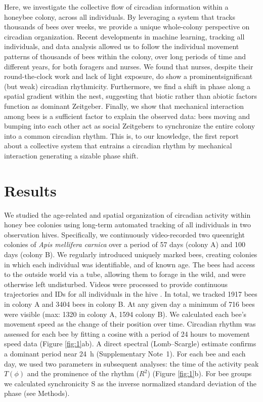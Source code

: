 \documentclass{article}
\newcommand{\added}[1]{{\color{blue}#1}}
\newcommand{\deleted}[1]{{\color{red}#1}} %
\newcommand{\replaced}[2]{\deleted{#1}\added{#2}}
\newcommand{\added}[1]{#1}
\newcommand{\deleted}[1]{}
\newcommand{\replaced}[2]{#2}
\begin{document}
Here, we investigate the collective flow of circadian information within a honeybee colony, across all individuals. \added{By leveraging a system that tracks thousands of bees over weeks, we provide a unique whole-colony perspective on circadian organization.} Recent developments in machine learning, tracking all individuals, and data analysis allowed us to follow the individual movement patterns of thousands of bees within the colony, over long periods of time and different years, for both foragers and nurses. We found that nurses, despite their round-the-clock work and lack of light exposure, do show a \replaced{prominent}{significant} (but weak) circadian rhythmicity. Furthermore, we find a shift in phase along a spatial gradient within the nest, suggesting that biotic rather than abiotic factors function as dominant Zeitgeber. Finally, we show that mechanical interaction among bees is a sufficient factor to explain the observed data: bees moving and bumping into each other act as social Zeitgebers to synchronize the entire colony into a common circadian rhythm. This is, to our knowledge, the first report about a collective system that entrains a circadian rhythm by mechanical interaction generating a sizable phase shift. 


\section{Results}
We studied the age-related and spatial organization of circadian activity within honey bee colonies using long-term automated tracking of all individuals in two observation hives. Specifically, we continuously video-recorded two queenright colonies of \textit{Apis mellifera carnica} over a period of 57 days (colony A) and 100 days (colony B). We regularly introduced uniquely marked bees, creating colonies in which each individual was identifiable, and of known age. The bees had access to the outside world via a tube, allowing them to forage in the wild, and were otherwise left undisturbed. Videos were processed to provide continuous trajectories and IDs for all individuals in the hive \cite{wario_automatic_2015, boenisch_tracking_2018, wild_automatic_2018, wild_social_2021}. In total, we tracked 1917 bees in colony A and 3404 bees in colony B. At any given day a minimum of 716 bees were visible (max: 1320 in colony A, 1594 colony B). We calculated each bee’s movement speed as the change of their position over time. Circadian rhythm was assessed for each bee by fitting a cosine with a period of 24 hours to movement speed data (Figure \ref{fig:1}\replaced{a}{b}). \added{A direct spectral (Lomb--Scargle) estimate confirms a dominant period near 24~h (Supplementary Note~1).} For each bee and each day, we used two parameters in subsequent analyses: the time of the activity peak $T(\phi)$ and the prominence of the rhythm ($R^2$) (Figure \ref{fig:1}b). For bee groups we calculated synchronicity S as the inverse normalized standard deviation of the phase (see Methods).  
\end{document}
